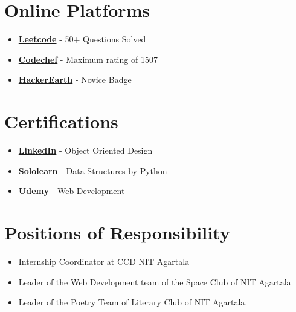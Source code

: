 \documentclass[a4,10.9pt]{article}
\newcommand{\resumeItem}[1]{
  \item\small{
    {#1 \vspace{-2pt}}
  }
}
\newcommand{\resumeItemListStart}{\begin{itemize}}
\newcommand{\resumeItemListEnd}{\end{itemize}\vspace{-5pt}}
\begin{document}
\begin{minipage}[t]{0.25\textwidth}
\begin{itemize}[leftmargin=0.15in, label={}]
 \end{itemize}
 

\section{Online Platforms}
     \resumeItemListStart
        \resumeItem{\href{https://leetcode.com/eshibhatt/}{\textbf{Leetcode}} - 50+ Questions Solved}
        \resumeItem{\href{https://www.codechef.com/users/eshibhat}{\textbf{Codechef}} - Maximum rating of 1507}
        \resumeItem{\href{https://www.hackerearth.com/@eshibhatt}{\textbf{HackerEarth}} - Novice Badge}
        
      \resumeItemListEnd
          
 
\section{Certifications}
     \resumeItemListStart
        \resumeItem{\href{https://www.linkedin.com/learning/certificates/e88ccc86c64b3d36c008eabf6f8b8b0f0a8fe1e68e4a38cbfbbde1c4bb2da006?trk=share_certificate}{\textbf{LinkedIn}} - Object Oriented Design}
        \resumeItem{\href{https://www.sololearn.com/Certificate/CT-VMC13SZX/png}{\textbf{Sololearn}} - Data Structures by Python}
        \resumeItem{\href{https://www.udemy.com/certificate/UC-88605bc3-a2e7-4c45-bd4a-5ee70a6a772c/}{\textbf{Udemy}} - Web Development}
        
      \resumeItemListEnd
      
\section{Positions of Responsibility}
    \resumeItemListStart
            \resumeItem{Internship Coordinator at CCD NIT Agartala}
            \resumeItem{Leader of the Web Development team of the Space Club of NIT Agartala}
            \resumeItem{Leader of the Poetry Team of Literary Club of NIT Agartala.}
            
          \resumeItemListEnd
          

\end{minipage} 
\end{document}
